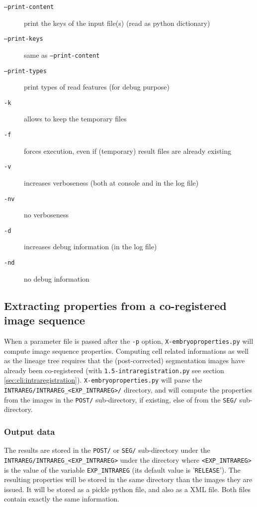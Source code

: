 \begin{description}
\item[\texttt{--print-content}] print the keys of the input file(s) (read as python dictionary)
\item[\texttt{--print-keys}] same as \texttt{--print-content}
\item[\texttt{--print-types}] print types of read features (for debug purpose)
\item[\texttt{-k}] allows to keep the temporary files
\item[\texttt{-f}] forces execution, even if (temporary) result files
  are already existing
\item[\texttt{-v}] increases verboseness (both at console and in the
  log file)
\item[\texttt{-nv}] no verboseness
\item[\texttt{-d}]  increases debug information (in the
  log file)
\item[\texttt{-nd}] no debug information
\end{description}

\subsection{Extracting properties from a co-registered image sequence}

When a parameter file is passed after the \texttt{-p} option, \texttt{X-embryoproperties.py} will compute image sequence properties.
Computing cell related informations as well as the lineage tree requires that the (post-corrected) segmentation images have already been co-registered (with \texttt{1.5-intraregistration.py} see section \ref{sec:cli:intraregistration}). 
\texttt{X-embryoproperties.py} will parse the \texttt{INTRAREG/INTRAREG\_<EXP\_INTRAREG>/} directory, and will compute the properties from the images in the \texttt{POST/} sub-directory, if existing, else of from the \texttt{SEG/} sub-directory.

\subsubsection{Output data}
The results are stored in the \texttt{POST/} or \texttt{SEG/} sub-directory 
under the \texttt{INTRAREG/INTRAREG\_<EXP\_INTRAREG>} under the directory where \texttt{<EXP\_INTRAREG>} is the value of the variable \texttt{EXP\_INTRAREG} (its
default value is '\texttt{RELEASE}').
The resulting properties will be stored in the same directory than the images they are issued. It will be stored as a pickle python file, and also as a XML file. Both files contain exactly the same information.

